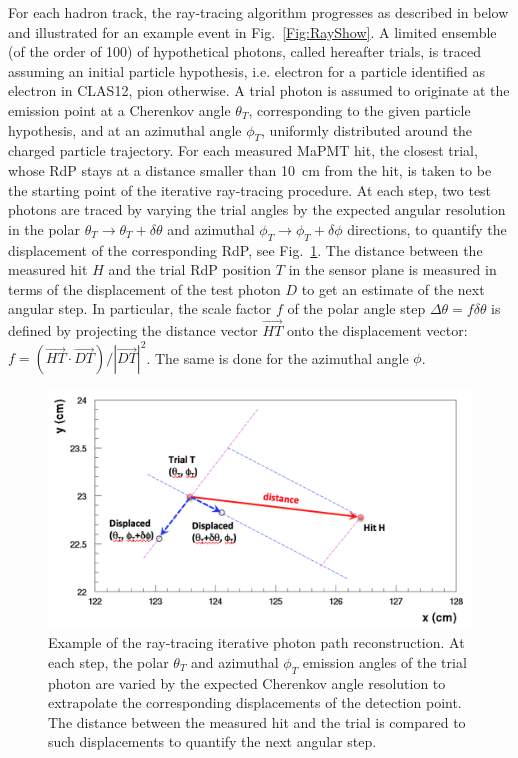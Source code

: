 For each hadron track, the ray-tracing algorithm progresses as described in below and illustrated for an example
event in Fig.~\ref{Fig:RayShow}. A limited ensemble (of the order of 100) of hypothetical photons, called hereafter
trials, is traced assuming an initial particle hypothesis, i.e. electron for a particle identified as electron in CLAS12,
pion otherwise. A trial photon is assumed to originate at the emission point at a Cherenkov angle $\theta_T$,
corresponding to the given particle hypothesis, and at an azimuthal angle $\phi_T$, uniformly distributed around
the charged particle trajectory. For each measured MaPMT hit, the closest trial, whose RdP stays at a distance
smaller than 10~cm from the hit, is taken to be the starting point of the iterative ray-tracing procedure. At each
step, two test photons are traced by varying the trial angles by the expected angular resolution in the polar
$\theta_T \to \theta_T + \delta \theta$ and azimuthal $\phi_T \to \phi_T + \delta \phi$ directions, to quantify
the displacement of the corresponding RdP, see Fig.~\ref{Fig:RayAlgo}. The distance between the measured hit
$H$ and the trial RdP position $T$ in the sensor plane is measured in terms of the displacement of the test photon
$D$ to get an estimate of the next angular step. In particular, the scale factor $f$ of the polar angle step
$\Delta \theta = f \delta \theta$ is defined by projecting the distance vector $\vec{HT}$ onto the displacement
vector: $f=(\vec{HT}\cdot \vec {DT}) / |\vec{DT}|^2$. The same is done for the azimuthal angle $\phi$.

\begin{figure}[t]
\begin{center}
\includegraphics[width=1.0\columnwidth]{pics/ray_trace_example.png}
\end{center}
\caption{Example of the ray-tracing iterative photon path reconstruction. At each step, the polar $\theta_T$
  and azimuthal $\phi_T$ emission angles of the trial photon are varied by the expected Cherenkov angle
  resolution to extrapolate the corresponding displacements of the detection point. The distance between the
  measured hit and the trial is compared to such displacements to quantify the next angular step.}
\label{Fig:RayAlgo}
\end{figure}

